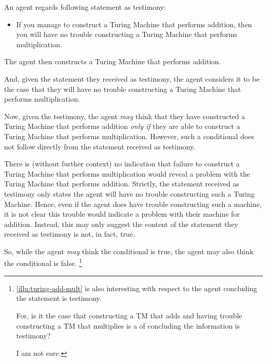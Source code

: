 \begin{note}[No entanglement]
  \begin{illustration}
    \label{illu:turing-add-mult}
    An agent regards following statement as testimony:

    \begin{itemize}
    \item
      If you manage to construct a Turing Machine that performs addition, then you will have no trouble constructing a Turing Machine that performs multiplication.
    \end{itemize}

    The agent then constructs a Turing Machine that performs addition.

    And, given the statement they received as testimony, the agent considers it to be the case that they will have no trouble constructing a Turing Machine that performs multiplication.
  \end{illustration}

  Now, given the testimony, the agent \emph{may} think that they have constructed a Turing Machine that performs addition \emph{only if} they are able to construct a Turing Machine that performs multiplication.
  However, such a conditional does not follow directly from the statement received as testimony.

  There is (without further context) no indication that failure to construct a Turing Machine that performs multiplication would reveal a problem with the Turing Machine that performs addition.
  Strictly, the statement received as testimony only states the agent will have no trouble constructing such a Turing Machine.
  Hence, even if the agent does have trouble constructing such a machine, it is not clear this trouble would indicate a problem with their machine for addition.
  Instead, this may only suggest the content of the statement they received as testimony is not, in fact, true.

  So, while the agent \emph{may} think the conditional is true, the agent may also think the conditional is false.%
  \footnote{
    \autoref{illu:turing-add-mult} is also interesting with respect to the agent concluding the statement is testimony.

    For, is it the case that constructing a TM that adds and having trouble constructing a TM that multiplies is a \requ{} of concluding the information is testimony?

    I am not sure.

}
\end{note}
